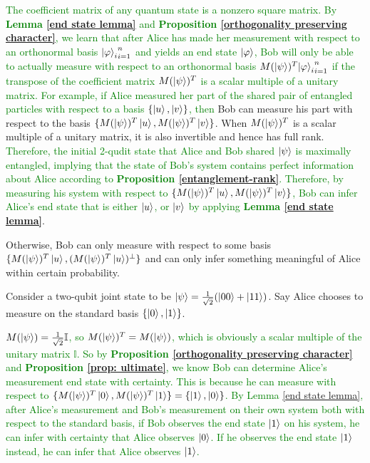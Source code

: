 \textcolor{green}{The coefficient matrix of any quantum state is a nonzero square matrix. By \textbf{Lemma \ref{end state lemma}} and \textbf{Proposition \ref{orthogonality preserving character}}, we learn that after Alice has made her measurement with respect to an orthonormal basis ${\ket{\varphi}_i}_{i=1}^n$ and yields an end state $\ket{\varphi}$, Bob will only be able to actually measure with respect to an orthonormal basis $M(\ket{\psi})^T {\ket{\varphi}_i}_{i=1}^n$ if the transpose of the coefficient matrix $M(\ket{\psi})^T$ is a scalar multiple of a unitary matrix. For example, if Alice measured her part of the shared pair of entangled particles with respect to a basis $\{\ket{u}, \ket{v}\}$, then }
Bob can measure his part with respect to the basis $\{M(\ket{\psi})^T\ket{u}, M(\ket{\psi})^T\ket{v}\}$. When $M(\ket{\psi})^T$ is a scalar multiple of a unitary matrix, it is also invertible and hence has full rank. \textcolor{green}{Therefore, the initial 2-qudit state that Alice and Bob shared $\ket{\psi}$ is maximally entangled, implying that the state of Bob's system contains perfect information about Alice according to \textbf{Proposition \ref{entanglement-rank}}. Therefore, by measuring his system with respect to $\{M(\ket{\psi})^T\ket{u}, M(\ket{\psi})^T\ket{v}\}$, Bob can infer Alice's end state that is either $\ket{u}$, or $\ket{v}$ by applying \textbf{Lemma \ref{end state lemma}}}. 

Otherwise, Bob can only measure with respect to some basis $\{M(\ket{\psi})^T\ket{u}, (M(\ket{\psi})^T\ket{u})^\perp \}$ and can only infer something meaningful of Alice within certain probability.

\begin{example}
Consider a two-qubit joint state to be $\ket{\psi}=\frac{1}{\sqrt{2}}(\ket{00}+\ket{11})$. Say Alice chooses to measure on the standard basis $\{\ket{0}, \ket{1}\}$.

\textcolor{green}{$M(\ket{\psi})=\frac{1}{\sqrt{2}}\mathbb{I}$, so $M(\ket{\psi})^T=M(\ket{\psi})$, which is obviously a scalar multiple of the unitary matrix $\mathbb{I}$. So by \textbf{Proposition \ref{orthogonality preserving character}} and \textbf{Proposition \ref{prop: ultimate}}, we know Bob can determine Alice's measurement end state with certainty. This is because he can measure with respect to  $\{M(\ket{\psi})^T\ket{0}, M(\ket{\psi})^T\ket{1}\}=\{\ket{1}, \ket{0}\}$. By Lemma \ref{end state lemma}, after Alice's measurement and Bob's measurement on their own system both with respect to the standard basis, if Bob observes the end state $\ket{1}$ on his system, he can infer with certainty that Alice observes $\ket{0}$. If he observes the end state $\ket{1}$ instead, he can infer that Alice observes $\ket{1}$.}
\end{example}

